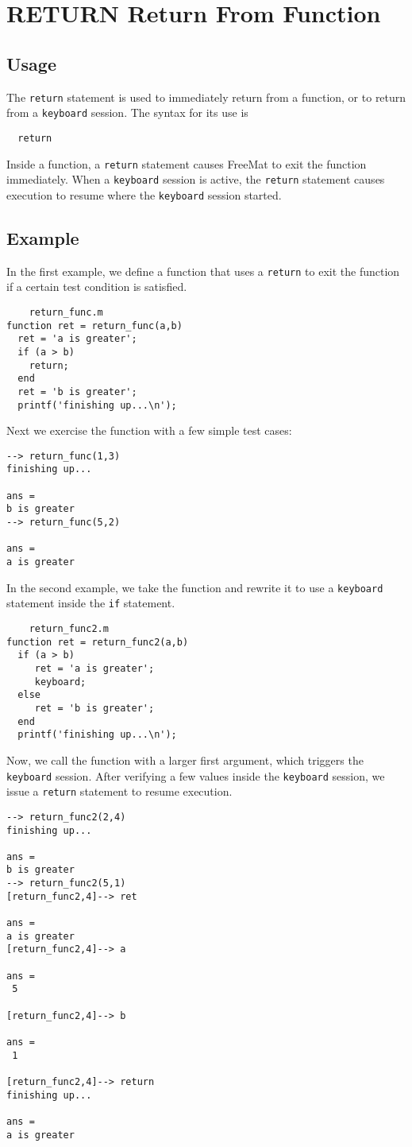 \section{RETURN Return From Function}

\subsection{Usage}

The \verb|return| statement is used to immediately return from
a function, or to return from a \verb|keyboard| session.  The 
syntax for its use is
\begin{verbatim}
  return
\end{verbatim}
Inside a function, a \verb|return| statement causes FreeMat
to exit the function immediately.  When a \verb|keyboard| session
is active, the \verb|return| statement causes execution to
resume where the \verb|keyboard| session started.
\subsection{Example}

In the first example, we define a function that uses a
\verb|return| to exit the function if a certain test condition 
is satisfied.
\begin{verbatim}
    return_func.m
function ret = return_func(a,b)
  ret = 'a is greater';
  if (a > b)
    return;
  end
  ret = 'b is greater';
  printf('finishing up...\n');
\end{verbatim}
Next we exercise the function with a few simple test
cases:
\begin{verbatim}
--> return_func(1,3)
finishing up...

ans = 
b is greater
--> return_func(5,2)

ans = 
a is greater
\end{verbatim}
In the second example, we take the function and rewrite
it to use a \verb|keyboard| statement inside the \verb|if| statement.
\begin{verbatim}
    return_func2.m
function ret = return_func2(a,b)
  if (a > b)
     ret = 'a is greater';
     keyboard;
  else
     ret = 'b is greater';
  end
  printf('finishing up...\n');
\end{verbatim}
Now, we call the function with a larger first argument, which
triggers the \verb|keyboard| session.  After verifying a few
values inside the \verb|keyboard| session, we issue a \verb|return|
statement to resume execution.
\begin{verbatim}
--> return_func2(2,4)
finishing up...

ans = 
b is greater
--> return_func2(5,1)
[return_func2,4]--> ret

ans = 
a is greater
[return_func2,4]--> a

ans = 
 5 

[return_func2,4]--> b

ans = 
 1 

[return_func2,4]--> return
finishing up...

ans = 
a is greater
\end{verbatim}
